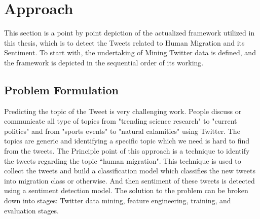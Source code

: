 \chapter{Approach}\label{chap:approach}
This section is a point by point depiction of the actualized framework utilized in this thesis, which is to detect the Tweets related to Human Migration  and its Sentiment. To start with, the undertaking of Mining Twitter data is defined, and the framework is depicted in the sequential order of its working.

\section{Problem Formulation}

Predicting the topic of the Tweet is very challenging work. People discuss or communicate all type of topics from "trending science research" to "current politics" and from "sports events" to "natural calamities" using Twitter. The topics are generic and identifying a specific topic which we need is hard to find from the tweets. The  
Principle point of this approach is a technique to identify the tweets regarding the topic ``human migration". This technique is used to  collect the tweets and build a classification model which classifies the new tweets into migration class or otherwise. And then sentiment of these tweets is detected using a sentiment detection model. The solution to the problem can be broken down into stages: Twitter data mining, feature engineering, training, and evaluation stages.


